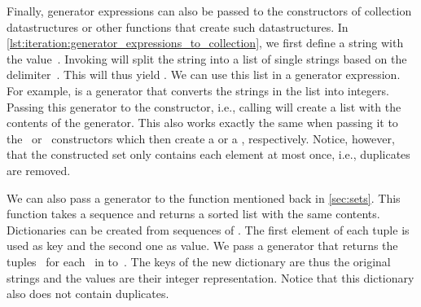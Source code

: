 \begin{sloppypar}%
Finally, generator expressions can also be passed to the constructors of collection datastructures or other functions that create such datastructures.
In \cref{lst:iteration:generator_expressions_to_collection}, we first define a string  with the value~.
Invoking  will split the string into a list of single strings based on the delimiter~.
This will thus yield \pythonil{["22", "56", "33", "67", "43", "33", "12"]}.
We can use this list in a generator expression.
For example,  is a generator that converts the strings in the list into integers.
Passing this generator to the  constructor, i.e., calling  will create a list with the contents of the generator.
This also works exactly the same when passing it to the~ or~ constructors which then create a  or a , respectively.
Notice, however, that the constructed set only contains each element at most once, i.e., duplicates are removed.%
\end{sloppypar}%
%
We can also pass a generator to the  function mentioned back in \cref{sec:sets}.
This function takes a sequence and returns a sorted list with the same contents.
Dictionaries can be created from sequences of .
The first element of each tuple is used as key and the second one as value.
We pass a generator that returns the tuples~ for each~ in  to~.
The keys of the new dictionary are thus the original strings and the values are their integer representation.
Notice that this dictionary also does not contain duplicates.

